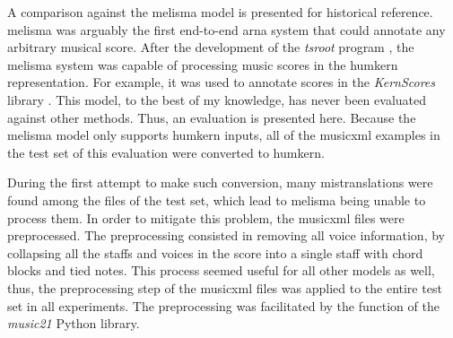 
A comparison against the \gls{melisma} model is presented
for historical reference. \gls{melisma} was arguably the
first end-to-end \gls{arna} system that could annotate any
arbitrary musical score. After the development of the
\emph{tsroot} program \parencite{sapp2009tsroot}, the
\gls{melisma} system was capable of processing music scores
in the \gls{humkern} representation. For example, it was
used to annotate scores in the \emph{KernScores} library
\parencite{sapp2005online}. This model, to the best of my
knowledge, has never been evaluated against other methods.
Thus, an evaluation is presented here. Because the
\gls{melisma} model only supports \gls{humkern} inputs, all
of the \gls{musicxml} examples in the test set of this
evaluation were converted to \gls{humkern}. 

During the first attempt to make such conversion, many
mistranslations were found among the files of the test set,
which lead to \gls{melisma} being unable to process them. In
order to mitigate this problem, the \gls{musicxml} files
were preprocessed. The preprocessing consisted in removing
all voice information, by collapsing all the staffs and
voices in the score into a single staff with chord blocks
and tied notes. This process seemed useful for all other
models as well, thus, the preprocessing step of the
\gls{musicxml} files was applied to the entire test set in
all experiments. The preprocessing was facilitated by the
 function of the \emph{music21} Python
library.




    
